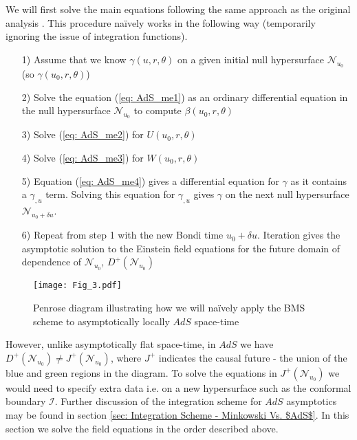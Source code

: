 \documentclass[a4paper,11pt]{article}
\numberwithin{equation}{section}
\begin{document}
We will first solve the main equations following the same approach as the original analysis  \cite{Bondi:1962px}. This procedure na\"ively works in the following way (temporarily ignoring the issue of integration functions). 
\begin{itemize}
\item[1)] Assume that we know $\gamma(u, r, \theta)$ on a given initial null hypersurface $\mathcal{N}_{u_0}$ (so $\gamma(u_0, r, \theta)$)
\item[2)] Solve the equation (\ref{eq: AdS_me1})  as an ordinary differential equation in the null hypersurface $\mathcal{N}_{u_0}$ to compute $\beta(u_0, r,\theta)$ 
\item[3)] Solve (\ref{eq: AdS_me2})  for $U(u_0, r, \theta)$ 
\item[4)] Solve (\ref{eq: AdS_me3})  for  $W(u_0, r, \theta)$ 
\item[5)] Equation (\ref{eq: AdS_me4})  gives a differential equation for $\gamma$ as it contains a $\gamma_{,u}$ term. Solving this equation for $\gamma_{,u}$ gives $\gamma$ on the next null hypersurface $\mathcal{N}_{u_0 + \delta u}$.
\item[6)] Repeat from step 1 with the new Bondi time $u_0+ \delta u$. Iteration gives the asymptotic solution to the Einstein field equations for the future domain of dependence of $\mathcal{N}_{u_0}$, $D^+(\mathcal{N}_{u_0})$
\end{itemize}  

\begin{figure}[h]
\begin{center}
\texttt{[image: Fig\_3.pdf]} 
\end{center}
\caption{Penrose diagram illustrating how we will na\"ively apply the BMS scheme to asymptotically locally $AdS$ space-time}
\label{fig: fig_3}
\end{figure}

However, unlike asymptotically flat space-time, in $AdS$ we have $D^+(\mathcal{N}_{u_0}) \neq J^+(\mathcal{N}_{u_0})$, where $J^+$ indicates the causal future - the union of the blue and green regions in the diagram. To solve the equations in $J^+(\mathcal{N}_{u_0})$ we would need to specify extra data i.e. on a new hypersurface such as the conformal boundary $\mathscr{I}$. Further discussion of the integration scheme for $AdS$ asymptotics may be found in section \ref{sec:  Integration Scheme - Minkowski Vs. $AdS$}. In this section we solve the field equations in the order described above. 
\end{document}
